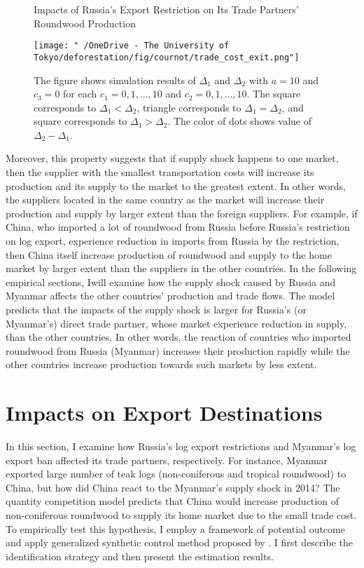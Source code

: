 \documentclass[a4paper,12pt]{article}
\begin{document}
\begin{figure}[H] 
    \centering
    \caption{Impacts of Russia's Export Restriction on Its Trade Partners' Roundwood Production}
    \texttt{[image: "~/OneDrive - The University of Tokyo/deforestation/fig/cournot/trade\_cost\_exit.png"]}
    \caption*{\small{The figure shows simulation results of $\Delta_1$ and $\Delta_2$ with $a = 10$ and $c_3 = 0$ for each $c_1 = 0, 1, ..., 10$ and $c_2 = 0, 1, ..., 10$. The square corresponds to $\Delta_1 < \Delta_2$, triangle corresponds to $\Delta_1 = \Delta_2$, and square corresponds to $\Delta_1 > \Delta_2$. The color of dots shows value of $\Delta_2 - \Delta_1$.}}
    \label{fig:cournot_simulation}
\end{figure}

Moreover, this property suggests that if supply shock happens to one market, then the supplier with the smallest transportation costs will increase its production and its supply to the market to the greatest extent. In other words, the suppliers located in the same country as the market will increase their production and supply by larger extent than the foreign suppliers. For example, if China, who imported a lot of roundwood from Russia before Russia's restriction on log export, experience reduction in imports from Russia by the restriction, then China itself increase production of roundwood and supply to the home market by larger extent than the suppliers in the other countries. In the following empirical sections, Iwill examine how the supply shock caused by Russia and Myanmar affects the other countries' production and trade flows. The model predicts that the impacts of the supply shock is larger for Russia's (or Myanmar's) direct trade partner, whose market experience reduction in supply, than the other countries. In other words, the reaction of countries who imported roundwood from Russia (Myanmar) increases their production rapidly while the other countries increase production towards such markets by less extent.



\section{Impacts on Export Destinations}
In this section, I examine how Russia's log export restrictions and Myanmar's log export ban affected its trade partners, respectively. For instance, Myanmar exported large number of teak logs (non-coniferous and tropical roundwood) to China, but how did China react to the Myanmar's supply shock in 2014? The quantity competition model predicts that China would increase production of non-coniferous roundwood to supply its home market due to the small trade cost. To empirically test this hypothesis, I employ a framework of potential outcome and apply generalized synthetic control method proposed by \cite{xu2017generalized}. I first describe the identification strategy and then present the estimation results.
\end{document}
